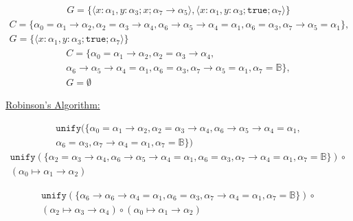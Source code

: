 \documentclass[11pt]{article}
\newcommand{\B}{\mathbb{B}}
\newcommand{\T}{\texttt{true}}
\newcommand{\U}{\texttt{unify}}
\newcommand{\rarr}{\rightarrow}
\begin{document}
\begin{enumerate}
\begin{multline}
		      G = \{  \langle  x: \alpha_1, y:\alpha_3 ; x ; \alpha_7 \rarr \alpha_5  \rangle, \langle x: \alpha_1, y:\alpha_3 ; \T ; \alpha_7 \rangle \}
	      \end{multline}
	      \begin{multline}
		      C = \{ \alpha_0 = \alpha_1 \rarr \alpha_2, \alpha_2 = \alpha_3 \rarr \alpha_4, \alpha_6 \rarr \alpha_5 \rarr \alpha_4 = \alpha_1, \alpha_6 = \alpha_3, \alpha_7 \rarr \alpha_5 = \alpha_1 \},                               \\
		      G = \{ \langle x: \alpha_1, y:\alpha_3 ; \T ; \alpha_7 \rangle \}
	      \end{multline}
	      \begin{multline}
		      C = \{ \alpha_0 = \alpha_1 \rarr \alpha_2, \alpha_2 = \alpha_3 \rarr \alpha_4, \\
		      \alpha_6 \rarr \alpha_5 \rarr \alpha_4 = \alpha_1, \alpha_6 = \alpha_3, \alpha_7 \rarr \alpha_5 = \alpha_1, \alpha_7 = \B \},                \\ 
		      G = \emptyset
	      \end{multline}

	

	\underline{Robinson's Algorithm:}
	
	\begin{multline}
		\U( \{ \alpha_0 = \alpha_1 \rarr \alpha_2, \alpha_2 = \alpha_3 \rarr \alpha_4, \alpha_6 \rarr \alpha_5 \rarr \alpha_4 = \alpha_1, \\ \alpha_6 = \alpha_3, \alpha_7 \rarr \alpha_4 = \alpha_1, \alpha_7 = \B \}) 
	\end{multline}
	\begin{multline}
		\U( \{ \alpha_2 = \alpha_3 \rarr \alpha_4, \alpha_6 \rarr \alpha_5 \rarr \alpha_4 = \alpha_1, \alpha_6 = \alpha_3, \alpha_7 \rarr \alpha_4 = \alpha_1, \alpha_7 = \B \}  ) \circ \\ ( \alpha_0 \mapsto \alpha_1 \rarr \alpha_2 )
	\end{multline}

	\begin{multline}
		\U( \{ \alpha_6 \rarr \alpha_6 \rarr \alpha_4 = \alpha_1, \alpha_6 = \alpha_3, \alpha_7 \rarr \alpha_4 = \alpha_1, \alpha_7 = \B \} )\circ \\ ( \alpha_2 \mapsto \alpha_3 \rarr \alpha_4) \circ ( \alpha_0 \mapsto \alpha_1 \rarr \alpha_2) 
	\end{multline}


\end{enumerate}
\end{document}
